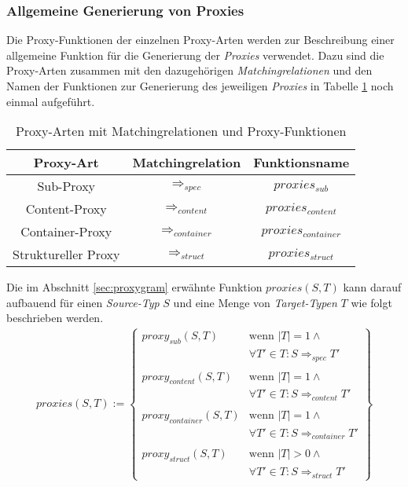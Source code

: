 \subsubsection{Allgemeine Generierung von Proxies}
Die Proxy-Funktionen der einzelnen Proxy-Arten werden zur Beschreibung einer allgemeine Funktion für die Generierung der \emph{Proxies} verwendet. Dazu sind die Proxy-Arten zusammen mit den dazugehörigen \emph{Matchingrelationen} und den Namen der Funktionen zur Generierung des jeweiligen \emph{Proxies} in Tabelle \ref{tab:baseMatcher} noch einmal aufgeführt.

\begin{table}[H]
\centering
\begin{tabular}{|c|c|c|}
\hline
\hline
\centering\textbf{Proxy-Art} & \textbf{Matchingrelation} & \textbf{Funktionsname}\\
\hline
\hline
Sub-Proxy
&  
$\Rightarrow_{spec}$
& 
$\mathit{proxies_{sub}}$
\\
\hline
Content-Proxy
& 
$\Rightarrow_{content}$
& 
$\mathit{proxies_{content}}$
\\
\hline
Container-Proxy
& 
$\Rightarrow_{container}$
& 
$\mathit{proxies_{container}}$
\\
\hline
Struktureller Proxy
&
$\Rightarrow_{struct}$
& 
$\mathit{proxies_{struct}}$
 \\
\hline
\hline
\end{tabular}
\caption{Proxy-Arten mit Matchingrelationen und Proxy-Funktionen}
 \label{tab:baseMatcher}
\end{table}
\noindent
Die im Abschnitt \ref{sec:proxygram} erwähnte Funktion $\mathit{proxies(S,T)}$ kann darauf aufbauend für einen \emph{Source-Typ} $S$ und eine Menge von \emph{Target-Typen} $T$ wie folgt beschrieben werden.
\begin{gather*}
\mathit{proxies(S,T)} := 
\left\{\begin{array}{ll}
\mathit{proxy_{sub}(S,T)}	& \text{wenn } |T| = 1 \wedge \mathit{ }\\
& \forall T' \in T: S \Rightarrow_{spec} T'\\	
&\\
\mathit{proxy_{content}(S,T)}	& \text{wenn } |T| = 1 \wedge \mathit{ }\\
& \forall T' \in T: S \Rightarrow_{content} T' \\
&\\
\mathit{proxy_{container}(S,T)} & \text{wenn } |T| = 1 \wedge \mathit{ } \\
& \forall T' \in T: S \Rightarrow_{container} T' \\
&\\
\mathit{proxy_{struct}(S,T)} & \text{wenn } |T| > 0 \wedge \mathit{ } \\
&\forall T' \in T: S \Rightarrow_{struct} T'
		 \end{array}
\right\}
\end{gather*}
